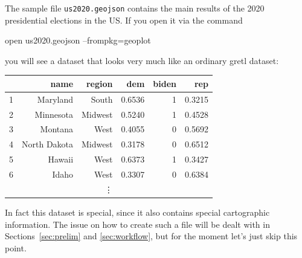 \documentclass{article}
\begin{document}
The sample file \texttt{us2020.geojson} contains the main results of
the 2020 presidential elections in the US. If you open it via the
command
\begin{code}
  open us2020.geojson --frompkg=geoplot
\end{code}
you will see a dataset that looks very much like an ordinary gretl
dataset:
\begin{center}
\begin{tabular}{rrrrrr}
\hline
   &          name &   region &         dem &    biden &      rep  \\ 
\hline                                                   
 1 &      Maryland &    South &      0.6536 &        1 &   0.3215  \\ 
 2 &     Minnesota &  Midwest &      0.5240 &        1 &   0.4528  \\ 
 3 &       Montana &     West &      0.4055 &        0 &   0.5692  \\ 
 4 &  North Dakota &  Midwest &      0.3178 &        0 &   0.6512  \\ 
 5 &        Hawaii &     West &      0.6373 &        1 &   0.3427  \\ 
 6 &         Idaho &     West &      0.3307 &        0 &   0.6384  \\ 
\multicolumn{6}{c}{\vdots} \\  
\hline
\end{tabular}
\end{center}

In fact this dataset is special, since it also contains special
cartographic information. The issue on how to create such a file will
be dealt with in Sections~\ref{sec:prelim} and \ref{sec:workflow}, but
for the moment let's just skip this point.
\end{document}
